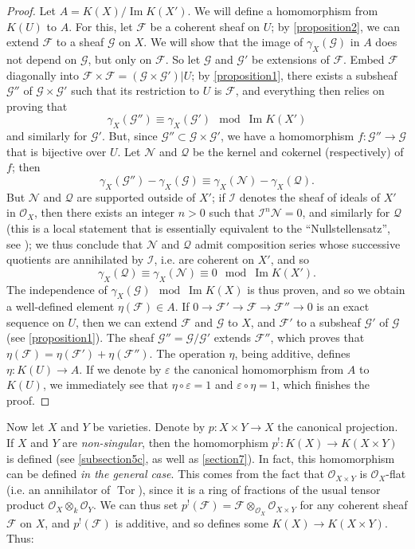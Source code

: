 \documentclass{article}
\theoremstyle{plain}
\theoremstyle{definition}
\newcommand{\sh}{\mathscr}
\DeclareMathOperator{\Tor}{Tor}
\newcommand{\oldpage}[1]{\marginpar{\footnotesize$\Big\vert$ \textit{p.~#1}}}
\begin{document}
\begin{proof}
  Let $A=K(X)/\operatorname{Im} K(X')$.
  We will define a homomorphism from $K(U)$ to $A$.
  For this, let $\sh{F}$ be a coherent sheaf on $U$;
  by \cref{proposition2}, we can extend $\sh{F}$ to a sheaf $\sh{G}$ on $X$.
  We will show that the image of $\gamma_X(\sh{G})$ in $A$ does not depend on $\sh{G}$, but only on $\sh{F}$.
  So let $\sh{G}$ and $\sh{G}'$ be extensions of $\sh{F}$.
  Embed $\sh{F}$ diagonally into $\sh{F}\times\sh{F}=(\sh{G}\times\sh{G}')|U$;
  by \cref{proposition1}, there exists a subsheaf $\sh{G}''$ of $\sh{G}\times\sh{G}'$ such that its restriction to $U$ is $\sh{F}$, and everything then relies on proving that
  \[
    \gamma_X(\sh{G}'') \equiv \gamma_X(\sh{G}') \mod \operatorname{Im}K(X')
  \]
  and similarly for $\sh{G}'$.
  But, since $\sh{G}''\subset\sh{G}\times\sh{G}'$, we have a homomorphism $f\colon\sh{G}''\to\sh{G}$ that is bijective over $U$.
  Let $\sh{N}$ and $\sh{Q}$ be the kernel and cokernel (respectively) of $f$;
  then
  \[
    \gamma_X(\sh{G}'') - \gamma_X(\sh{G})
    \equiv \gamma_X(\sh{N}) - \gamma_X(\sh{Q}).
  \]
  But $\sh{N}$ and $\sh{Q}$ are supported outside of $X'$;
  if $\sh{I}$ denotes the sheaf
\oldpage{116}
  of ideals of $X'$ in $\sh{O}_X$, then there exists an integer $n>0$ such that $\sh{I}^n\sh{N}=0$, and similarly for $\sh{Q}$ (this is a local statement that is essentially equivalent to the ``Nullstellensatz'', see \cite{14});
  we thus conclude that $\sh{N}$ and $\sh{Q}$ admit composition series whose successive quotients are annihilated by $\sh{I}$, i.e. are coherent on $X'$, and so
  \[
    \gamma_X(\sh{Q}) \equiv \gamma_X(\sh{N}) \equiv 0 \mod \operatorname{Im}K(X').
  \]
  The independence of $\gamma_X(\sh{G}) \mod\operatorname{Im}K(X)$ is thus proven, and so we obtain a well-defined element $\eta(\sh{F})\in A$.
  If $0\to\sh{F}'\to\sh{F}\to\sh{F}''\to0$ is an exact sequence on $U$, then we can extend $\sh{F}$ and $\sh{G}$ to $X$, and $\sh{F}'$ to a subsheaf $\sh{G}'$ of $\sh{G}$ (see \cref{proposition1}).
  The sheaf $\sh{G}''=\sh{G}/\sh{G}'$ extends $\sh{F}''$, which proves that $\eta(\sh{F})=\eta(\sh{F}')+\eta(\sh{F}'')$.
  The operation $\eta$, being additive, defines $\eta\colon K(U)\to A$.
  If we denote by $\varepsilon$ the canonical homomorphism from $A$ to $K(U)$, we immediately see that $\eta\circ\varepsilon=1$ and $\varepsilon\circ\eta=1$, which finishes the proof.
\end{proof}

Now let $X$ and $Y$ be varieties.
Denote by $p\colon X\times Y\to X$ the canonical projection.
If $X$ and $Y$ are \emph{non-singular}, then the homomorphism $p^!\colon K(X)\to K(X\times Y)$ is defined (see \cref{subsection5c}, as well as \cref{section7}).
In fact, this homomorphism can be defined \emph{in the general case}.
This comes from the fact that $\sh{O}_{X\times Y}$ is $\sh{O}_X$-flat (i.e. an annihilator of $\Tor$), since it is a ring of fractions of the usual tensor product $\sh{O}_X\otimes_k\sh{O}_Y$.
We can thus set $p^!(\sh{F})=\sh{F}\otimes_{\sh{O}_X}\sh{O}_{X\times Y}$ for any coherent sheaf $\sh{F}$ on $X$, and $p^!(\sh{F})$ is additive, and so defines some $K(X)\to K(X\times Y)$.
Thus:
\end{document}
